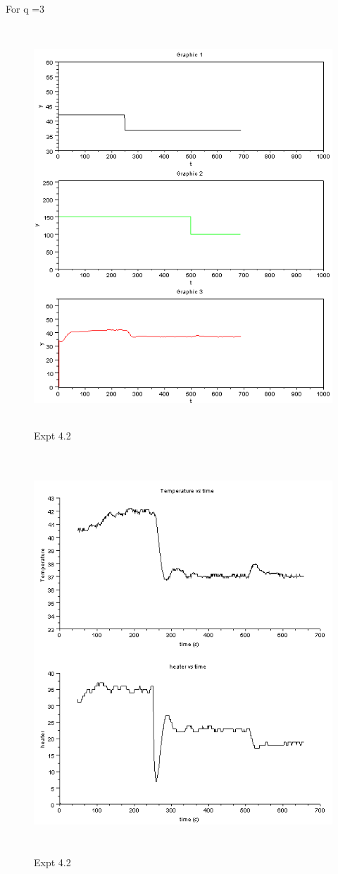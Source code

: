 For q =3
\begin{figure}[H]
  \includegraphics[width=12cm, height=15cm]{mpc/4_2.PNG}
  \caption{Expt 4.2}
\end{figure}
\begin{figure}[H]
  \includegraphics[width=12cm, height=15cm]{mpc/4_2_heater_final.png}
  \caption{Expt 4.2}
\end{figure}


